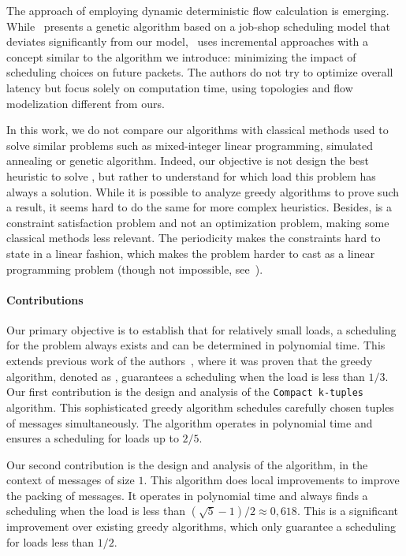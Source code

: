 \documentclass[pdflatex,sn-mathphys,iicol]{sn-jnl}%
\theoremstyle{thmstyleone}%
\theoremstyle{thmstyletwo}%
\theoremstyle{thmstylethree}%
\begin{document}
The approach of employing dynamic deterministic flow calculation is emerging. While~\cite{9234005} presents a genetic algorithm based on a job-shop scheduling model that deviates significantly from our model,~\cite{gartner2023fast} uses incremental approaches with a concept similar to the \swapandmove algorithm we introduce: minimizing the impact of scheduling choices on future packets. The authors do not try to optimize overall latency but focus solely on computation time, using topologies and flow modelization different from ours.

In this work, we do not compare our algorithms with classical methods used to solve similar problems such as mixed-integer linear programming, simulated annealing or genetic algorithm. Indeed, our objective is not design the best heuristic to solve \pma, but rather to understand for which load this problem has always a solution. While it is possible to analyze greedy algorithms to prove such a result, it seems hard to do the same for more complex heuristics. Besides, \pma is a constraint satisfaction problem and not an optimization problem, making some classical methods less relevant. The periodicity makes the constraints hard to state in a linear fashion, which makes the problem harder to cast as a linear programming problem (though not impossible, see~\cite{bartharxiv2018deterministic}). 

\paragraph*{Contributions}


Our primary objective is to establish that for relatively small loads, a scheduling for the \pma problem always exists and can be determined in polynomial time. 
This extends previous work of the authors~\cite{bartharxiv2018deterministic}, where it was proven that the greedy algorithm, denoted as \metaoffset, guarantees a scheduling when the load is less than $1/3$.
Our first contribution is the design and analysis of the \texttt{Compact k-tuples} algorithm. This sophisticated greedy algorithm schedules carefully chosen tuples of messages simultaneously.
The algorithm operates in polynomial time and ensures a scheduling for loads up to $2/5$.

Our second contribution is the design and analysis of the \swapandmove algorithm, in the context of messages of size $1$. This algorithm does local improvements to improve the packing of messages. It operates in polynomial time and always finds a scheduling when the load is less than $(\sqrt{5}-1)/2 \approx 0,618$. This is a significant improvement over existing greedy algorithms, which only guarantee a scheduling for loads less than $1/2$.
\end{document}
